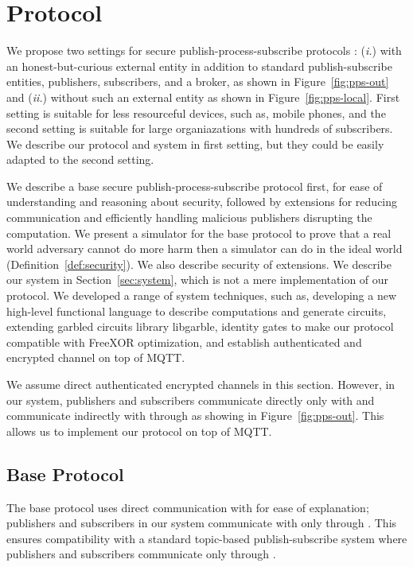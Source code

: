 \section{Protocol}
\label{sec:protocol}

We propose two settings for secure publish-process-subscribe protocols :
(\emph{i.}) with an honest-but-curious external entity in addition to standard
publish-subscribe entities, publishers, subscribers, and a broker, as shown in
Figure~\ref{fig:pps-out} and (\emph{ii.}) without such an external entity as
shown in Figure~\ref{fig:pps-local}. First setting is suitable for less
resourceful devices, such as, mobile phones, and the second setting is suitable
for large organiazations with hundreds of subscribers. We describe our protocol
and system in first setting, but they could be easily adapted to the second
setting.



We describe a base secure publish-process-subscribe protocol first, for ease of
understanding and reasoning about security, followed by extensions for reducing
communication and efficiently handling malicious publishers disrupting the
computation.  We present a simulator for the base protocol to prove that a real
world adversary cannot do more harm then a simulator can do in the ideal world
(Definition~\ref{def:security}). We also describe security of extensions. We
describe our system in Section~\ref{sec:system}, which is not a mere
implementation of our protocol. We developed a range of system techniques, such
as, developing a new high-level functional language to describe computations
and generate circuits, extending garbled circuits library libgarble, identity
gates to make our protocol compatible with FreeXOR optimization, and establish
authenticated and encrypted channel on top of MQTT. 

We assume direct authenticated encrypted channels in this section.  However, in
our system, publishers and subscribers communicate directly only with \broker
and communicate indirectly with \garbler through \broker as showing in
Figure~\ref{fig:pps-out}. This allows us to implement our protocol on top of
MQTT.

\subsection{Base Protocol}


The base protocol uses direct communication with \garbler for ease of
explanation; publishers and subscribers in our system communicate with \garbler
only through \broker. This ensures compatibility with a standard topic-based
publish-subscribe system where publishers and subscribers communicate only
through \broker.

